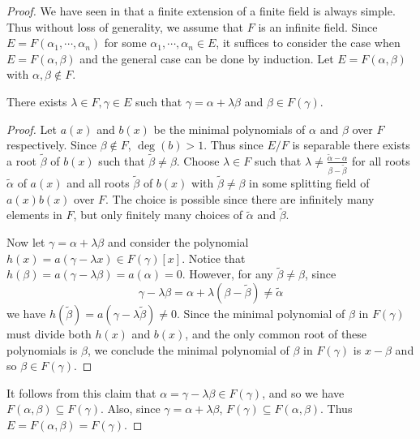 \documentclass[11pt]{article}
\begin{document}
\begin{proof}
    We have seen in  that a finite extension of a finite field is always simple. Thus without loss of generality, we assume that $F$ is an infinite field. Since $E=F(\alpha_1,\cdots,\alpha_n)$ for some $\alpha_1,\cdots,\alpha_n\in E$, it suffices to consider the case when $E=F(\alpha,\beta)$ and the general case can be done by induction. Let $E=F(\alpha,\beta)$ with $\alpha,\beta\not\in F$.

    \begin{claim}
        There exists $\lambda\in F,\gamma\in E$ such that $\gamma=\alpha+\lambda\beta$ and $\beta\in F(\gamma)$.
    \end{claim}
    \begin{proof}
        Let $a(x)$ and $b(x)$ be the minimal polynomials of $\alpha$ and $\beta$ over $F$ respectively. Since $\beta\not\in F$, $\deg(b)>1$. Thus since $E/F$ is separable there exists a root $\tilde{\beta}$ of $b(x)$ such that $\tilde{\beta}\neq\beta$. Choose $\lambda\in F$ such that $\lambda\neq\frac{\tilde{\alpha}-\alpha}{\beta-\tilde{\beta}}$ for all roots $\tilde{\alpha}$ of $a(x)$ and all roots $\tilde{\beta}$ of $b(x)$ with $\tilde{\beta}\neq\beta$ in some splitting field of $a(x)b(x)$ over $F$. The choice is possible since there are infinitely many elements in $F$, but only finitely many choices of $\tilde{\alpha}$ and $\tilde{\beta}$.

        Now let $\gamma=\alpha+\lambda\beta$ and consider the polynomial $h(x)=a(\gamma-\lambda x)\in F(\gamma)[x]$. Notice that $h(\beta)=a(\gamma-\lambda\beta)=a(\alpha)=0$. However, for any $\tilde{\beta}\neq\beta$, since
        \[\gamma-\lambda\beta=\alpha+\lambda(\beta-\tilde{\beta})\neq\tilde{\alpha}\]
        we have $h(\tilde{\beta})=a(\gamma-\lambda\tilde\beta)\neq0$. Since the minimal polynomial of $\beta$ in $F(\gamma)$ must divide both $h(x)$ and $b(x)$, and the only common root of these polynomials is $\beta$, we conclude the minimal polynomial of $\beta$ in $F(\gamma)$ is $x-\beta$ and so $\beta\in F(\gamma)$.
        
    \end{proof}
    It follows from this claim that $\alpha=\gamma-\lambda\beta\in F(\gamma)$, and so we have $F(\alpha,\beta)\subseteq F(\gamma)$. Also, since $\gamma=\alpha+\lambda\beta$, $F(\gamma)\subseteq F(\alpha,\beta)$. Thus $E=F(\alpha,\beta)=F(\gamma)$.
    
\end{proof}
\end{document}
